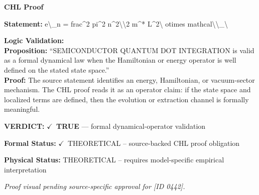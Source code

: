 \vspace{0.45em}
\noindent\textbf{CHL Proof}\par
\textbf{Statement:} e\textbackslash{}\_n = frac\textasciicircum{}2 pi\textasciicircum{}2 n\textasciicircum{}2\textbackslash{}\textbackslash{}2 m\textasciicircum{}* L\textasciicircum{}2\textbackslash{} otimes mathcal\textbackslash{}\textbackslash{}\_\textbackslash{}

\textbf{Logic Validation:}\\
\textbf{Proposition:} ``SEMICONDUCTOR QUANTUM DOT INTEGRATION is valid as a formal dynamical law when the
Hamiltonian or energy operator is well defined on the stated state space.''\\
\textbf{Proof:} The source statement identifies an energy, Hamiltonian, or vacuum-sector mechanism. The
CHL proof reads it as an operator claim: if the state space and localized terms are
defined, then the evolution or extraction channel is formally meaningful.

\textbf{VERDICT:} \ensuremath{\checkmark}\ \textbf{TRUE} --- formal dynamical-operator validation

\textbf{Formal Status:} \ensuremath{\checkmark}\ THEORETICAL -- source-backed CHL proof obligation

\textbf{Physical Status:} THEORETICAL -- requires model-specific empirical interpretation
\par\vspace{0.45em}
\par
\vfill
\begingroup\footnotesize\itshape
Proof visual pending source-specific approval for [ID 0442].
\par\endgroup
\vfill
\endgroup
\endgroup
